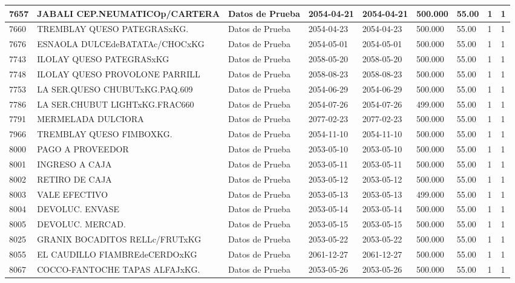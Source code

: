 \documentclass[a4paper,12pt]{article}
\begin{document}
\begin{landscape}
\begin{longtable}{|p{4cm}|p{2.5cm}|p{2.5cm}|p{1.8cm}|p{1.8cm}|p{1cm}|p{1cm}|p{3cm}|p{3cm}||}
7657 & JABALI CEP.NEUMATICOp/CARTERA & Datos de Prueba & 2054-04-21 & 2054-04-21 & 500.000 & 55.00 & 1 & 1 \\ \hline 
7660 & TREMBLAY QUESO PATEGRASxKG. & Datos de Prueba & 2054-04-23 & 2054-04-23 & 500.000 & 55.00 & 1 & 1 \\ \hline 
7676 & ESNAOLA DULCEdeBATATAc/CHOCxKG & Datos de Prueba & 2054-05-01 & 2054-05-01 & 500.000 & 55.00 & 1 & 1 \\ \hline 
7743 & ILOLAY QUESO PATEGRASxKG & Datos de Prueba & 2058-05-20 & 2058-05-20 & 500.000 & 55.00 & 1 & 1 \\ \hline 
7748 & ILOLAY QUESO PROVOLONE PARRILL & Datos de Prueba & 2058-08-23 & 2058-08-23 & 500.000 & 55.00 & 1 & 1 \\ \hline 
7753 & LA SER.QUESO CHUBUTxKG.PAQ.609 & Datos de Prueba & 2054-06-29 & 2054-06-29 & 500.000 & 55.00 & 1 & 1 \\ \hline 
7786 & LA SER.CHUBUT LIGHTxKG.FRAC660 & Datos de Prueba & 2054-07-26 & 2054-07-26 & 499.000 & 55.00 & 1 & 1 \\ \hline 
7791 & MERMELADA DULCIORA & Datos de Prueba & 2077-02-23 & 2077-02-23 & 500.000 & 55.00 & 1 & 1 \\ \hline 
7966 & TREMBLAY QUESO FIMBOXKG. & Datos de Prueba & 2054-11-10 & 2054-11-10 & 500.000 & 55.00 & 1 & 1 \\ \hline 
8000 & PAGO A PROVEEDOR & Datos de Prueba & 2053-05-10 & 2053-05-10 & 500.000 & 55.00 & 1 & 1 \\ \hline 
8001 & INGRESO A CAJA & Datos de Prueba & 2053-05-11 & 2053-05-11 & 500.000 & 55.00 & 1 & 1 \\ \hline 
8002 & RETIRO DE CAJA & Datos de Prueba & 2053-05-12 & 2053-05-12 & 500.000 & 55.00 & 1 & 1 \\ \hline 
8003 & VALE EFECTIVO & Datos de Prueba & 2053-05-13 & 2053-05-13 & 499.000 & 55.00 & 1 & 1 \\ \hline 
8004 & DEVOLUC. ENVASE & Datos de Prueba & 2053-05-14 & 2053-05-14 & 500.000 & 55.00 & 1 & 1 \\ \hline 
8005 & DEVOLUC. MERCAD. & Datos de Prueba & 2053-05-15 & 2053-05-15 & 500.000 & 55.00 & 1 & 1 \\ \hline 
8025 & GRANIX BOCADITOS RELLc/FRUTxKG & Datos de Prueba & 2053-05-22 & 2053-05-22 & 500.000 & 55.00 & 1 & 1 \\ \hline 
8055 & EL CAUDILLO FIAMBREdeCERDOxKG & Datos de Prueba & 2061-12-27 & 2061-12-27 & 500.000 & 55.00 & 1 & 1 \\ \hline 
8067 & COCCO-FANTOCHE TAPAS ALFAJxKG. & Datos de Prueba & 2053-05-26 & 2053-05-26 & 500.000 & 55.00 & 1 & 1 \\ \hline 

\end{longtable}
\end{landscape}
\end{document}
